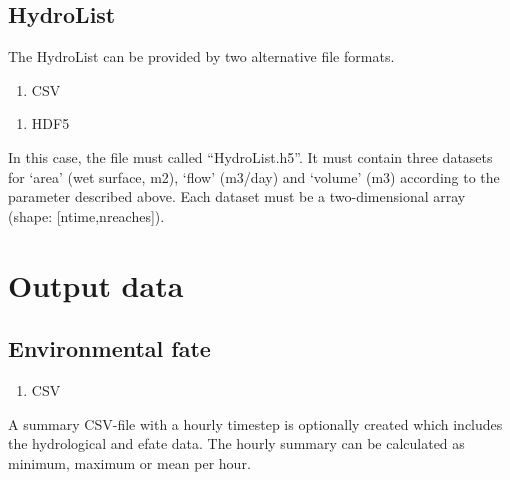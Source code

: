 \documentclass[letterpaper,10pt,english]{sphinxmanual}
\begin{document}
\section{HydroList}
\label{\detokenize{index:hydrolist}}
The HydroList can be provided by two alternative file formats.
\begin{enumerate}
\def\theenumi{\arabic{enumi}}
\def\labelenumi{\theenumi )}
\makeatletter\def\p@enumii{\p@enumi \theenumi )}\makeatother
\item {} 
CSV

\end{enumerate}

\begin{figure}[htbp]
\centering

\noindent{}
\end{figure}
\begin{enumerate}
\def\theenumi{\arabic{enumi}}
\def\labelenumi{\theenumi )}
\makeatletter\def\p@enumii{\p@enumi \theenumi )}\makeatother
\setcounter{enumi}{1}
\item {} 
HDF5

\end{enumerate}

In this case, the file must called “HydroList.h5”. It must contain
three datasets for ‘area’ (wet surface, m2),
‘flow’ (m3/day) and ‘volume’ (m3) according to the parameter described above. Each dataset
must be  a two-dimensional array (shape: {[}ntime,nreaches{]}).


\chapter{Output data}
\label{\detokenize{index:output-data}}

\section{Environmental fate}
\label{\detokenize{index:environmental-fate}}\begin{enumerate}
\def\theenumi{\arabic{enumi}}
\def\labelenumi{\theenumi )}
\makeatletter\def\p@enumii{\p@enumi \theenumi )}\makeatother
\item {} 
CSV

\end{enumerate}

A summary CSV-file with a hourly timestep is optionally created which includes the
hydrological and efate data. The hourly summary can be calculated as minimum, maximum or
mean per hour.
\end{document}
